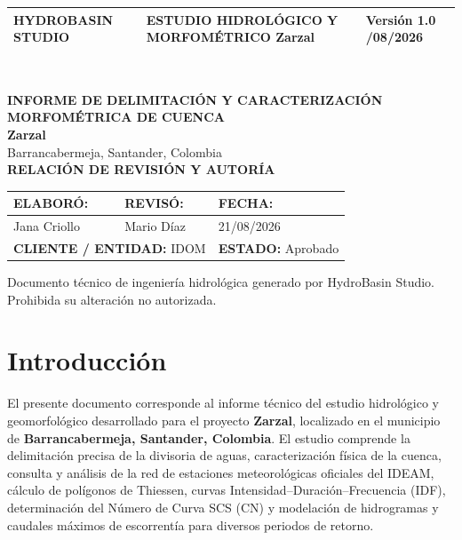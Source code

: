 \documentclass[11pt,a4paper]{article}
\begin{document}
\begin{titlepage}
\vspace*{0.8cm}
\noindent
\begin{tabular}{|p{4.2cm}|p{8.0cm}|p{3.4cm}|}\hline
\textbf{\color{hbaccent}HYDROBASIN STUDIO} & \textbf{ESTUDIO HIDROLÓGICO Y MORFOMÉTRICO} \newline \small Zarzal & \small Versión 1.0 \newline 21/08/2026 \\\hline
\end{tabular}\\[2.0cm]

\begin{center}
{\Huge\bfseries INFORME DE DELIMITACIÓN Y CARACTERIZACIÓN MORFOMÉTRICA DE CUENCA}\\[0.6cm]
{\Large\bfseries Zarzal}\\[0.3cm]
{\normalsize Barrancabermeja, Santander, Colombia}\\[2.2cm]

\textbf{RELACIÓN DE REVISIÓN Y AUTORÍA}\\[3mm]
\begin{tabular}{|p{4.5cm}|p{5.0cm}|p{4.5cm}|}\hline
\textbf{ELABORÓ:} & \textbf{REVISÓ:} & \textbf{FECHA:} \\\hline
Jana Criollo & Mario Díaz & 21/08/2026 \\\hline
\multicolumn{2}{|l|}{\textbf{CLIENTE / ENTIDAD:} IDOM} & \textbf{ESTADO:} Aprobado \\\hline
\end{tabular}
\end{center}

\vfill
\noindent
{\footnotesize Documento técnico de ingeniería hidrológica generado por HydroBasin Studio. Prohibida su alteración no autorizada.}
\end{titlepage}

\tableofcontents
\vspace{0.6cm}
\listoffigures
\vspace{0.6cm}
\listoftables
\newpage

\section{Introducción}
El presente documento corresponde al informe técnico del estudio hidrológico y geomorfológico desarrollado para el proyecto \textbf{Zarzal}, localizado en el municipio de \textbf{Barrancabermeja, Santander, Colombia}. El estudio comprende la delimitación precisa de la divisoria de aguas, caracterización física de la cuenca, consulta y análisis de la red de estaciones meteorológicas oficiales del IDEAM, cálculo de polígonos de Thiessen, curvas Intensidad--Duración--Frecuencia (IDF), determinación del Número de Curva SCS (CN) y modelación de hidrogramas y caudales máximos de escorrentía para diversos periodos de retorno.
\end{document}
